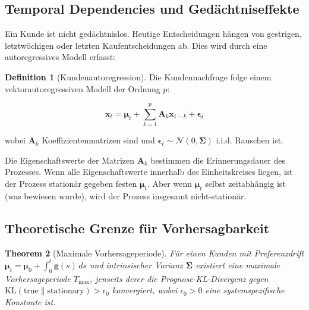 \documentclass[a4paper, 12pt, twoside, openright]{report}
\newtheorem{theorem}{Theorem}[section]
\theoremstyle{definition}
\newtheorem{definition}[theorem]{Definition}
\theoremstyle{definition}
\newcommand{\vx}{\bm{x}}
\newcommand{\KL}{\mathrm{KL}}
\begin{document}
\subsection{Temporal Dependencies und Gedächtniseffekte}

Ein Kunde ist nicht gedächtnislos. Heutige Entscheidungen hängen von gestrigen, letztwöchigen oder letzten Kaufentscheidungen ab. Dies wird durch eine autoregressives Modell erfasst:

\begin{definition}[Kundenautoregression]
Die Kundennachfrage folge einem vektorautoregressiven Modell der Ordnung $p$:

\begin{equation}
\vx_t = \bm{\mu}_t + \sum_{k=1}^p \bm{A}_k \vx_{t-k} + \bm{\epsilon}_t
\label{eq:var_customer}
\end{equation}

wobei $\bm{A}_k$ Koeffizientenmatrizen sind und $\bm{\epsilon}_t \sim \mathcal{N}(0, \bm{\Sigma})$ i.i.d. Rauschen ist.
\end{definition}

Die Eigenschaftswerte der Matrizen $\bm{A}_k$ bestimmen die Erinnerungsdauer des Prozesses. Wenn alle Eigenschaftswerte innerhalb des Einheitskreises liegen, ist der Prozess stationär gegeben festen $\bm{\mu}_t$. Aber wenn $\bm{\mu}_t$ selbst zeitabhängig ist (was bewiesen wurde), wird der Prozess insgesamt nicht-stationär.

\subsection{Theoretische Grenze für Vorhersagbarkeit}

\begin{theorem}[Maximale Vorhersageperiode]
\label{thm:max_prediction}
Für einen Kunden mit Preferenzdrift $\bm{\mu}_t = \bm{\mu}_0 + \int_0^t \bm{g}(s) \, ds$ und intrinsischer Varianz $\bm{\Sigma}$ existiert eine maximale Vorhersageperiode $T_{\max}$, jenseits derer die Prognose-KL-Divergenz gegen $\KL(\text{true} \parallel \text{stationary}) > \epsilon_0$ konvergiert, wobei $\epsilon_0 > 0$ eine systemspezifische Konstante ist.
\end{theorem}
\end{document}
